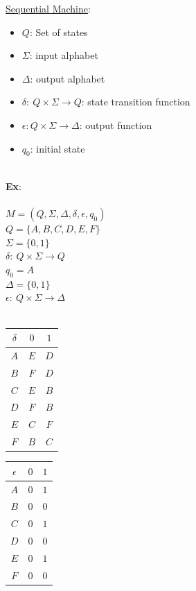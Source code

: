 \documentclass{scrartcl}
\begin{document}
\underline{Sequential Machine}:
\begin{itemize}
\item $Q$: Set of states
\item $\Sigma$: input alphabet
\item $\Delta$: output alphabet
\item $\delta:\ Q\times\Sigma\rightarrow Q$: state transition function
\item $\epsilon: Q\times\Sigma\rightarrow\Delta$: output function
\item $q_0$: initial state
\end{itemize}\ \\
\textbf{Ex}:\\\\
$M=(Q,\Sigma,\Delta,\delta,\epsilon,q_0)$\\
$Q=\{A,B,C,D,E,F\}$\\
$\Sigma=\{0,1\}$\\
$\delta:\ Q\times\Sigma\rightarrow Q$\\
$q_0=A$\\
$\Delta=\{0,1\}$\\
$\epsilon:\ Q\times\Sigma\rightarrow\Delta$\\\\
\begin{minipage}{0.45\linewidth}\centering
\begin{tabular} {|c|c c|}
\hline
$\delta$&$0$&$1$\\
\hline
$A$ & $E$ & $D$\\
$B$ & $F$ & $D$\\
$C$ & $E$ & $B$\\
$D$ & $F$ & $B$\\
$E$ & $C$ & $F$\\
$F$ & $B$ & $C$\\
\hline
\end{tabular}
\end{minipage}
\begin{minipage}{0.45\linewidth}\centering
\begin{tabular} {|c|c c|}
\hline
$\epsilon$&$0$&$1$\\
\hline
$A$ & $0$ & $1$\\
$B$ & $0$ & $0$\\
$C$ & $0$ & $1$\\
$D$ & $0$ & $0$\\
$E$ & $0$ & $1$\\
$F$ & $0$ & $0$\\
\hline
\end{tabular}
\end{minipage}\\
\end{document}
